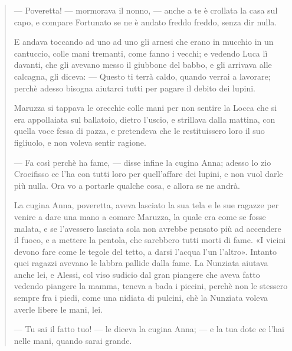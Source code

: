 \documentclass{book}
\newcounter{mar}
\begin{document}
\begin{quote}
— Poveretta! — mormorava il nonno, — anche a te è crollata la casa sul capo, e compare Fortunato se ne è andato freddo freddo, senza dir nulla.

E andava toccando ad uno ad uno gli arnesi che erano in mucchio in un cantuccio, colle mani tremanti, come fanno i vecchi; e vedendo Luca lì davanti, che gli avevano messo il giubbone del babbo, e gli arrivava alle calcagna, gli diceva: — Questo ti terrà caldo, quando verrai a lavorare; perchè adesso bisogna aiutarci tutti per pagare il debito dei lupini.

Maruzza si tappava le orecchie colle mani per non sentire la Locca che si era appollaiata sul ballatoio, dietro l’uscio, e strillava dalla mattina, con quella voce fessa di pazza, e pretendeva che le restituissero loro il suo figliuolo, e non voleva sentir ragione.

— Fa così perchè ha fame, — disse infine la cugina Anna; adesso lo zio Crocifisso ce l’ha con tutti loro per quell’affare dei lupini, e non vuol darle più nulla. Ora vo a portarle qualche cosa, e allora se ne andrà.

La cugina Anna, poveretta, aveva lasciato la sua tela e le sue ragazze per venire a dare una mano a comare Maruzza, la quale era come se fosse malata, e se l’avessero lasciata sola non avrebbe pensato più ad accendere il fuoco, e a mettere la pentola, che sarebbero tutti morti di fame. «I vicini devono fare come le tegole del tetto, a darsi l’acqua l’un l’altro». Intanto quei ragazzi avevano le labbra pallide dalla fame. La Nunziata aiutava anche lei, e Alessi, col viso sudicio dal gran piangere che aveva fatto vedendo piangere la mamma, teneva a bada i piccini, perchè non le stessero sempre fra i piedi, come una nidiata di pulcini, chè la Nunziata voleva averle libere le mani, lei.

— Tu sai il fatto tuo! — le diceva la cugina Anna; — e la tua dote ce l’hai nelle mani, quando sarai grande.
\end{quote}
\end{document}
